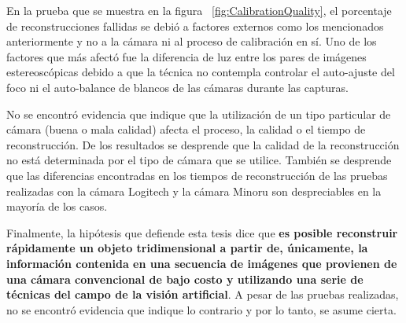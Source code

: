 En la prueba que se muestra en la figura ~\ref{fig:CalibrationQuality}, el porcentaje de reconstrucciones fallidas se debi\'{o} a factores externos como los mencionados anteriormente y no a la c\'{a}mara ni al proceso de calibraci\'{o}n en s\'{i}. Uno de los factores que m\'{a}s afect\'{o} fue la diferencia de luz entre los pares de im\'{a}genes estereosc\'{o}picas debido a que la t\'{e}cnica no contempla controlar el auto-ajuste del foco ni el auto-balance de blancos de las c\'{a}maras durante las capturas.

No se encontr\'{o} evidencia que indique que la utilizaci\'{o}n de un tipo particular de c\'{a}mara (buena o mala calidad) afecta el proceso, la calidad o el tiempo de reconstrucci\'{o}n. De los resultados se desprende que la calidad de la reconstrucci\'{o}n no est\'{a} determinada por el tipo de c\'{a}mara que se utilice. Tambi\'{e}n se desprende que las diferencias encontradas en los tiempos de reconstrucci\'{o}n de las pruebas realizadas con la c\'{a}mara Logitech y la c\'{a}mara Minoru son despreciables en la mayor\'{i}a de los casos.

Finalmente, la hip\'{o}tesis que defiende esta tesis dice que \textbf{es posible reconstruir r\'{a}pidamente un objeto tridimensional a partir de, \'{u}nicamente, la informaci\'{o}n contenida en una secuencia de im\'{a}genes que provienen de una c\'{a}mara convencional de bajo costo y utilizando una serie de t\'{e}cnicas del campo de la visi\'{o}n artificial}. A pesar de las pruebas realizadas, no se encontró evidencia que indique lo contrario y por lo tanto, se asume cierta.


